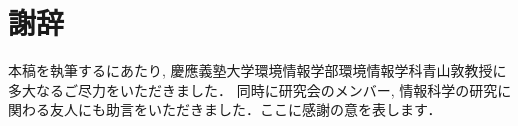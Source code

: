 \section{謝辞}

本稿を執筆するにあたり, 慶應義塾大学環境情報学部環境情報学科青山敦教授に多大なるご尽力をいただきました．
同時に研究会のメンバー, 情報科学の研究に関わる友人にも助言をいただきました．ここに感謝の意を表します． 